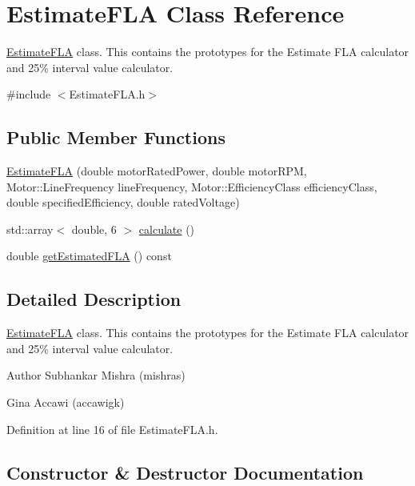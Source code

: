 \hypertarget{class_estimate_f_l_a}{}\section{Estimate\+F\+LA Class Reference}
\label{class_estimate_f_l_a}


\hyperlink{class_estimate_f_l_a}{Estimate\+F\+LA} class. This contains the prototypes for the Estimate F\+LA calculator and 25\% interval value calculator.  




{\ttfamily \#include $<$Estimate\+F\+L\+A.\+h$>$}

\subsection*{Public Member Functions}
\begin{DoxyCompactItemize}
\item 
\hyperlink{class_estimate_f_l_a_ace098c4a684eb4926b20322cf65da32d}{Estimate\+F\+LA} (double motor\+Rated\+Power, double motor\+R\+PM, Motor\+::\+Line\+Frequency line\+Frequency, Motor\+::\+Efficiency\+Class efficiency\+Class, double specified\+Efficiency, double rated\+Voltage)
\item 
std\+::array$<$ double, 6 $>$ \hyperlink{class_estimate_f_l_a_a89b9f73ef39f297c0358440523d14fca}{calculate} ()
\item 
double \hyperlink{class_estimate_f_l_a_adcb6eef313c8184f52b9ca038fbeddaa}{get\+Estimated\+F\+LA} () const
\end{DoxyCompactItemize}


\subsection{Detailed Description}
\hyperlink{class_estimate_f_l_a}{Estimate\+F\+LA} class. This contains the prototypes for the Estimate F\+LA calculator and 25\% interval value calculator. 

\begin{DoxyAuthor}{Author}
Subhankar Mishra (mishras) 

Gina Accawi (accawigk) 
\end{DoxyAuthor}


Definition at line 16 of file Estimate\+F\+L\+A.\+h.



\subsection{Constructor \& Destructor Documentation}
\mbox{\label{class_estimate_f_l_a_ace098c4a684eb4926b20322cf65da32d}} 
